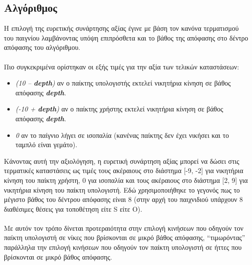 \documentclass{article}
\begin{document}
    \subsection*{Αλγόριθμος}
        Η επιλογή της ευρετικής συνάρτησης αξίας έγινε με βάση τον κανόνα τερματισμού του παιγνίου λαμβάνοντας υπόψη επιπρόσθετα και το βάθος της απόφασης στο δέντρο απόφασης του αλγόριθμου.\\\\
        Πιο συγκεκριμένα ορίστηκαν οι εξής τιμές για την αξία των τελικών καταστάσεων:
        \begin{itemize}
            \item \textit{(10 – \textbf{depth})} αν ο παίκτης υπολογιστής εκτελεί νικητήρια κίνηση σε βάθος απόφασης \textit{\textbf{depth}}.
            \item \textit{(-10 + \textbf{depth})} αν ο παίκτης χρήστης εκτελεί νικητήρια κίνηση σε βάθος απόφασης \textit{\textbf{depth}}.
            \item \textit{0} αν το παίγνιο λήγει σε ισοπαλία (κανένας παίκτης δεν έχει νικήσει και το ταμπλό είναι γεμάτο).
        \end{itemize}
        Κάνοντας αυτή την αξιολόγηση, η ευρετική συνάρτηση αξίας μπορεί να δώσει στις τερματικές καταστάσεις ως τιμές τους ακέραιους στο διάστημα
        [-9, -2] για νικητήρια κίνηση του παίκτη χρήστη, 0 για ισοπαλία και τους ακέραιους στο διάστημα [2, 9] για
        νικητήρια κίνηση του παίκτη υπολογιστή. Εδώ χρησιμοποιήθηκε το γεγονός πως το μέγιστο βάθος του δέντρου
        απόφασης είναι 8 (στην αρχή του παιχνιδιού υπάρχουν 8 διαθέσιμες θέσεις
        για τοποθέτηση είτε S είτε O).\\\\
        Με αυτόν τον τρόπο δίνεται προτεραιότητα στην επιλογή κινήσεων που οδηγούν τον παίκτη υπολογιστή σε νίκες που βρίσκονται σε μικρό βάθος απόφασης, “τιμωρόντας” παράλληλα την επιλογή
        κινήσεων που οδηγούν τον παίκτη υπολογιστή σε ήττες που βρίσκονται σε μικρό βάθος απόφασης.
    
\end{document}
